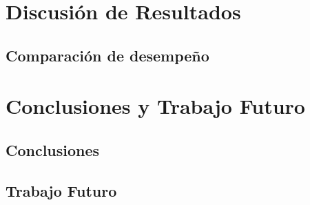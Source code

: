 \documentclass[12pt, a4paper]{article}
\begin{document}
\section{Discusión de Resultados}
\subsection{Comparación de desempeño}


\section{Conclusiones y Trabajo Futuro}
\subsection{Conclusiones}
\subsection{Trabajo Futuro}

\newpage
\printbibliography[heading=bibintoc, title={Referencias}]
\end{document}
